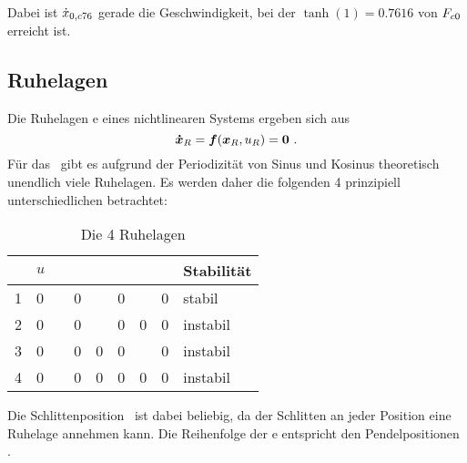 Dabei ist $\dot{x}_{0,c76}$ gerade die Geschwindigkeit, bei der $\tanh(1)=0.7616$ von $F_{c0}$ erreicht ist.





\subsection{Ruhelagen}\label{sec:aps}

Die Ruhelagen \bzw \ap e eines nichtlinearen Systems ergeben sich aus
	\[
	\vexp_R = \ve{f}(\vex_R,u_R) = \ve{0}  \ .
\]
Für das \spds\ gibt es aufgrund der Periodizität von Sinus und Kosinus theoretisch unendlich viele Ruhelagen. Es werden daher die folgenden 4 prinzipiell unterschiedlichen betrachtet:
\begin{table}[h]
	\centering
	\caption{Die 4 Ruhelagen}
		\begin{tabular}{lllllllll}
		\toprule
			\ap  & $u$ & \xo & \xop & \phe & \phep & \phz & \phzp & Stabilität  \\
			\midrule
			1	&	0 &	\xor	&	0	&	\pii	&	0	&	\pii	&	0	& stabil  \\
			2	&	0 &	\xor	&	0	&	\pii	&	0	&	0			&	0	& instabil  \\
			3	&	0 &	\xor	&	0	&	0			&	0	&	\pii	&	0	& instabil  \\
			4	&	0 &	\xor	&	0	&	0			&	0	&	0			&	0	& instabil  \\
			\bottomrule
		\end{tabular}
	\label{tab:aps}
\end{table}

Die Schlittenposition \xo\ ist dabei beliebig, da der Schlitten an jeder Position eine Ruhelage annehmen kann.
Die Reihenfolge der \ap e entspricht den Pendelpositionen .


